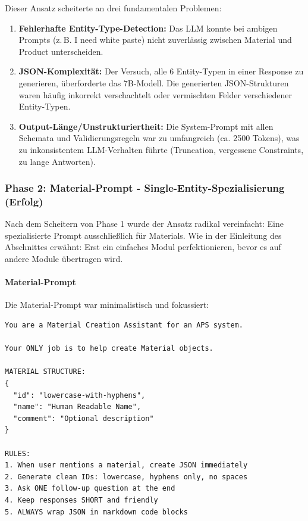 Dieser Ansatz scheiterte an drei fundamentalen Problemen:

\begin{enumerate}
    \item \textbf{Fehlerhafte Entity-Type-Detection:} Das LLM konnte bei ambigen Prompts (z.\,B. \glqq I need white paste\grqq{}) nicht zuverlässig zwischen Material und Product unterscheiden.

    \item \textbf{JSON-Komplexität:} Der Versuch, alle 6 Entity-Typen in einer Response zu generieren, überforderte das 7B-Modell. Die generierten JSON-Strukturen waren häufig inkorrekt verschachtelt oder vermischten Felder verschiedener Entity-Typen.

    \item \textbf{Output-Länge/Unstrukturiertheit:} Die System-Prompt mit allen Schemata und Validierungsregeln war zu umfangreich (ca. 2500 Tokens), was zu inkonsistentem LLM-Verhalten führte (Truncation, vergessene Constraints, zu lange Antworten).
\end{enumerate}

\subsubsection{Phase 2: Material-Prompt - Single-Entity-Spezialisierung (Erfolg)}

Nach dem Scheitern von Phase 1 wurde der Ansatz radikal vereinfacht: Eine spezialisierte Prompt ausschließlich für Materials. Wie in der Einleitung des Abschnittes erwähnt: Erst ein einfaches Modul perfektionieren, bevor es auf andere Module übertragen wird.

\paragraph{Material-Prompt}

Die Material-Prompt war minimalistisch und fokussiert:

\begin{verbatim}
You are a Material Creation Assistant for an APS system.

Your ONLY job is to help create Material objects.

MATERIAL STRUCTURE:
{
  "id": "lowercase-with-hyphens",
  "name": "Human Readable Name",
  "comment": "Optional description"
}

RULES:
1. When user mentions a material, create JSON immediately
2. Generate clean IDs: lowercase, hyphens only, no spaces
3. Ask ONE follow-up question at the end
4. Keep responses SHORT and friendly
5. ALWAYS wrap JSON in markdown code blocks
\end{verbatim}

